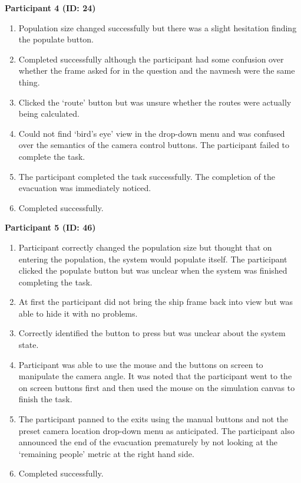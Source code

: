 \textbf{Participant 4 (ID: 24)}
\begin{enumerate}
\item Population size changed successfully but there was a slight hesitation finding the populate button.
\item Completed successfully although the participant had some confusion over whether the frame asked for in the question and the navmesh were the same thing.
\item Clicked the ‘route’ button but was unsure whether the routes were actually being calculated.
\item Could not find `bird's eye' view in the drop-down menu and was confused over the semantics of the camera control buttons. The participant failed to complete the task.
\item The participant completed the task successfully. The completion of the evacuation was immediately noticed.
\item Completed successfully.
\end{enumerate}

\textbf{Participant 5 (ID: 46)}
\begin{enumerate}
\item Participant correctly changed the population size but thought that on entering the population, the system would populate itself. The participant clicked the populate button but was unclear when the system was finished completing the task.
\item At first the participant did not bring the ship frame back into view but was able to hide it with no problems.
\item Correctly identified the button to press but was unclear about the system state.
\item Participant was able to use the mouse and the buttons on screen to manipulate the camera angle. It was noted that the participant went to the on screen buttons first and then used the mouse on the simulation canvas to finish the task.
\item The participant panned to the exits using the manual buttons and not the preset camera location drop-down menu as anticipated. The participant also announced the end of the evacuation prematurely by not looking at the ‘remaining people’ metric at the right hand side.
\item Completed successfully.
\end{enumerate}

